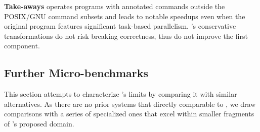 \documentclass[letterpaper,twocolumn,10pt]{article}
\newcommand{\heading}[1]{\vspace{4pt}\noindent\textbf{#1}\enspace}
\newcommand{\cn}[1]{\mbox{\textcircled{\footnotesize #1}}}
\newcommand{\sta}{\cn{\textsc{S}}\xspace}
\newcommand{\pur}{\cn{\textsc{P}}\xspace}
\newcommand{\dfs}{\cn{\textsc{F}}\xspace}
\newcommand{\kk}[1]{[{\color{magenta}kk: #1}]}
\begin{document}
\heading{Take-aways}
\sys operates programs with annotated commands outside the POSIX/GNU command subsets and leads to notable speedups even when the original program features significant task-based parallelism.
\sys's conservative transformations do not risk breaking correctness, thus do not improve the first component.

% 
% 
% 
% 

\subsection{Further Micro-benchmarks}
\label{micro}


This section attempts to characterize \sys's limits by comparing it with similar alternatives.
As there are no prior systems that directly comparable to \sys, we draw comparisons with a series of specialized ones that excel within smaller fragments of \sys's proposed domain.
\end{document}
